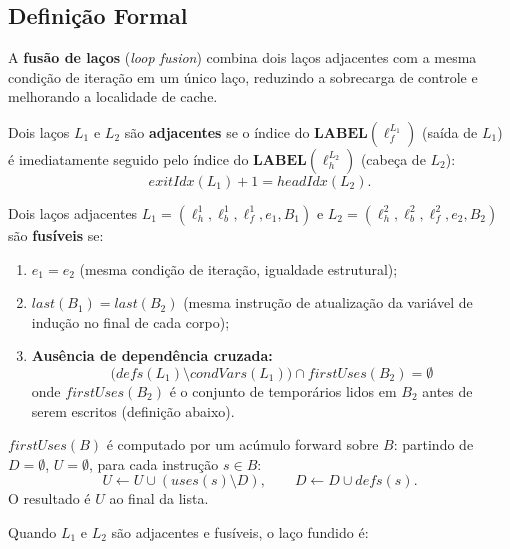 \subsection{Definição Formal}

A \textbf{fusão de laços} (\emph{loop fusion}) combina dois laços adjacentes
com a mesma condição de iteração em um único laço, reduzindo a sobrecarga de
controle e melhorando a localidade de cache.

\begin{Definition}[Adjacência]\label{def:adjacent}
  Dois laços $L_1$ e $L_2$ são \textbf{adjacentes} se o índice do
  $\mathbf{LABEL}(\ell_f^{L_1})$ (saída de $L_1$) é imediatamente seguido pelo
  índice do $\mathbf{LABEL}(\ell_h^{L_2})$ (cabeça de $L_2$):
  \[
    \mathit{exitIdx}(L_1) + 1 = \mathit{headIdx}(L_2).
  \]
\end{Definition}

\begin{Definition}[Fusibilidade]\label{def:fusible}
  Dois laços adjacentes $L_1 = (\ell_h^1, \ell_b^1, \ell_f^1, e_1, B_1)$ e
  $L_2 = (\ell_h^2, \ell_b^2, \ell_f^2, e_2, B_2)$ são \textbf{fusíveis} se:
  \begin{enumerate}
    \item $e_1 = e_2$ (mesma condição de iteração, igualdade estrutural);
    \item $\mathit{last}(B_1) = \mathit{last}(B_2)$ (mesma instrução de
      atualização da variável de indução no final de cada corpo);
    \item \textbf{Ausência de dependência cruzada:}
      \[
        \bigl(\mathit{defs}(L_1) \setminus \mathit{condVars}(L_1)\bigr)
        \cap \mathit{firstUses}(B_2) = \emptyset
      \]
      onde $\mathit{firstUses}(B_2)$ é o conjunto de temporários lidos em $B_2$
      antes de serem escritos (definição abaixo).
  \end{enumerate}
\end{Definition}

\begin{Definition}\label{def:first-uses}
  $\mathit{firstUses}(B)$ é computado por um acúmulo forward sobre $B$:
  partindo de $D = \emptyset$, $U = \emptyset$, para cada instrução $s \in B$:
  \[
    U \leftarrow U \cup (\mathit{uses}(s) \setminus D),
    \qquad
    D \leftarrow D \cup \mathit{defs}(s).
  \]
  O resultado é $U$ ao final da lista.
\end{Definition}

Quando $L_1$ e $L_2$ são adjacentes e fusíveis, o laço fundido é:

